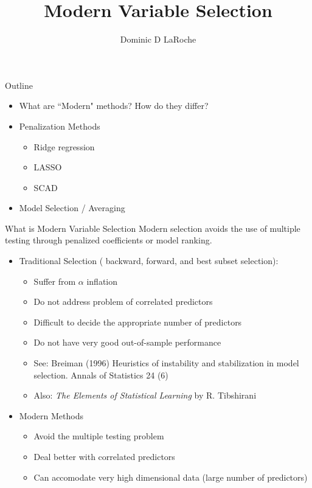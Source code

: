 \documentclass{beamer}\usepackage[]{graphicx}\usepackage[]{color}
\title{Modern Variable Selection}
\author{Dominic D LaRoche}
\begin{document}
\begin{frame}{Outline}
\begin{itemize}
\item What are ``Modern" methods?  How do they differ?
\item Penalization Methods
  \begin{itemize}
  \item Ridge regression
  \item LASSO
  \item SCAD
  \end{itemize}
\item Model Selection / Averaging
\end{itemize}
\end{frame}

\begin{frame}{What is Modern Variable Selection}
Modern selection avoids the use of multiple testing through penalized coefficients or model ranking.
\begin{itemize}
\item Traditional Selection ( backward, forward, and best subset selection):
  \begin{itemize}
  \item Suffer from $\alpha$ inflation
  \item Do not address problem of correlated predictors
  \item Difficult to decide the appropriate number of predictors
  \item Do not have very good out-of-sample performance
  \item See: Breiman (1996) Heuristics of instability and stabilization in model selection. Annals of Statistics 24 (6)
  \item Also: \emph{The Elements of Statistical Learning} by R. Tibshirani
  \end{itemize}
\break
\item Modern Methods
  \begin{itemize}
  \item Avoid the multiple testing problem
  \item Deal better with correlated predictors
  \item Can accomodate very high dimensional data (large number of predictors)
  \end{itemize}
\end{itemize}
\end{frame}
\end{document}
